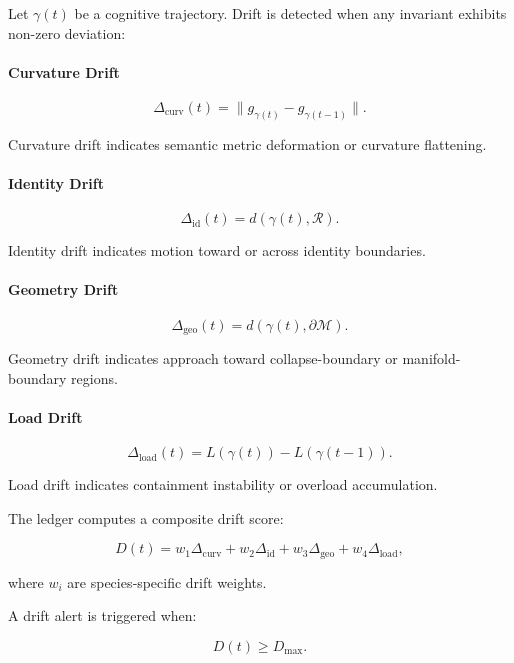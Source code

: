 \noindent Let $\gamma(t)$ be a cognitive trajectory. Drift is detected when any
invariant exhibits non-zero deviation:

\paragraph{Curvature Drift}


\[
\Delta_{\mathrm{curv}}(t)
=
\| g_{\gamma(t)} - g_{\gamma(t-1)} \|.
\]


Curvature drift indicates semantic metric deformation or curvature flattening.

\paragraph{Identity Drift}


\[
\Delta_{\mathrm{id}}(t)
=
d(\gamma(t), \mathcal{R}).
\]


Identity drift indicates motion toward or across identity boundaries.

\paragraph{Geometry Drift}


\[
\Delta_{\mathrm{geo}}(t)
=
d(\gamma(t), \partial\mathcal{M}).
\]


Geometry drift indicates approach toward collapse-boundary or manifold-boundary
regions.

\paragraph{Load Drift}


\[
\Delta_{\mathrm{load}}(t)
=
L(\gamma(t)) - L(\gamma(t-1)).
\]


Load drift indicates containment instability or overload accumulation.

\medskip

\noindent The ledger computes a composite drift score:


\[
D(t)
=
w_1 \Delta_{\mathrm{curv}}
+
w_2 \Delta_{\mathrm{id}}
+
w_3 \Delta_{\mathrm{geo}}
+
w_4 \Delta_{\mathrm{load}},
\]


where $w_i$ are species‑specific drift weights.

\medskip

\noindent A drift alert is triggered when:


\[
D(t) \ge D_{\max}.
\]



